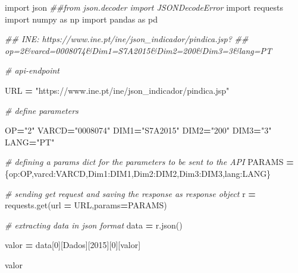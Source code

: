 \documentclass[
  12pt,
]{article}
\newenvironment{Shaded}{\begin{snugshade}}{\end{snugshade}}
\newcommand{\CommentTok}[1]{\textcolor[rgb]{0.56,0.35,0.01}{\textit{#1}}}
\newcommand{\DecValTok}[1]{\textcolor[rgb]{0.00,0.00,0.81}{#1}}
\newcommand{\ImportTok}[1]{#1}
\newcommand{\NormalTok}[1]{#1}
\newcommand{\OperatorTok}[1]{\textcolor[rgb]{0.81,0.36,0.00}{\textbf{#1}}}
\newcommand{\StringTok}[1]{\textcolor[rgb]{0.31,0.60,0.02}{#1}}
\begin{document}
\begin{Shaded}
\begin{Highlighting}[]
\ImportTok{import}\NormalTok{ json}
\CommentTok{\#\#from json.decoder import JSONDecodeError}
\ImportTok{import}\NormalTok{ requests}
\ImportTok{import}\NormalTok{ numpy }\ImportTok{as}\NormalTok{ np}
\ImportTok{import}\NormalTok{ pandas }\ImportTok{as}\NormalTok{ pd}

\CommentTok{\#\# INE: https://www.ine.pt/ine/json\_indicador/pindica.jsp?}
\CommentTok{\#\# op=2\&varcd=0008074\&Dim1=S7A2015\&Dim2=200\&Dim3=3\&lang=PT}

\CommentTok{\# api{-}endpoint}

\NormalTok{URL }\OperatorTok{=} \StringTok{"https://www.ine.pt/ine/json\_indicador/pindica.jsp"}

\CommentTok{\# define parameters}

\NormalTok{OP}\OperatorTok{=}\StringTok{"2"}
\NormalTok{VARCD}\OperatorTok{=}\StringTok{"0008074"}
\NormalTok{DIM1}\OperatorTok{=}\StringTok{"S7A2015"}
\NormalTok{DIM2}\OperatorTok{=}\StringTok{"200"}
\NormalTok{DIM3}\OperatorTok{=}\StringTok{"3"}
\NormalTok{LANG}\OperatorTok{=}\StringTok{"PT"}


\CommentTok{\# defining a params dict for the parameters to be sent to the API}
\NormalTok{PARAMS }\OperatorTok{=}\NormalTok{ \{}\StringTok{\textquotesingle{}op\textquotesingle{}}\NormalTok{:OP,}\StringTok{\textquotesingle{}varcd\textquotesingle{}}\NormalTok{:VARCD,}\StringTok{\textquotesingle{}Dim1\textquotesingle{}}\NormalTok{:DIM1,}\StringTok{\textquotesingle{}Dim2\textquotesingle{}}\NormalTok{:DIM2,}\StringTok{\textquotesingle{}Dim3\textquotesingle{}}\NormalTok{:DIM3,}\StringTok{\textquotesingle{}lang\textquotesingle{}}\NormalTok{:LANG\}}

\CommentTok{\# sending get request and saving the response as response object}
\NormalTok{r }\OperatorTok{=}\NormalTok{ requests.get(url }\OperatorTok{=}\NormalTok{ URL,params}\OperatorTok{=}\NormalTok{PARAMS)}

\CommentTok{\# extracting data in json format}
\NormalTok{data }\OperatorTok{=}\NormalTok{ r.json()}

\NormalTok{valor }\OperatorTok{=}\NormalTok{ data[}\DecValTok{0}\NormalTok{][}\StringTok{\textquotesingle{}Dados\textquotesingle{}}\NormalTok{][}\StringTok{\textquotesingle{}2015\textquotesingle{}}\NormalTok{][}\DecValTok{0}\NormalTok{][}\StringTok{\textquotesingle{}valor\textquotesingle{}}\NormalTok{]}

\NormalTok{valor}
\end{Highlighting}
\end{Shaded}
\end{document}
